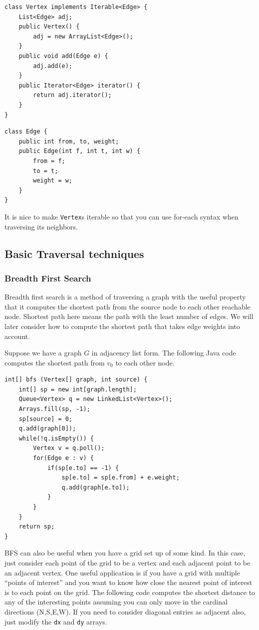 \documentclass[a4paper,12pt]{article}
\begin{document}
\begin{lstlisting}
class Vertex implements Iterable<Edge> {
	List<Edge> adj;
	public Vertex() {
		adj = new ArrayList<Edge>();
	}
	public void add(Edge e) {
		adj.add(e);
	}
	public Iterator<Edge> iterator() {
		return adj.iterator();
	}
}
\end{lstlisting}

\begin{lstlisting}
class Edge {
	public int from, to, weight;
	public Edge(int f, int t, int w) {
		from = f;
		to = t;
		weight = w;
	}
}
\end{lstlisting}

It is nice to make \verb|Vertex|s iterable so that you can use for-each syntax when traversing its neighbors. 

\subsection{Basic Traversal techniques}

\subsubsection{Breadth First Search}

Breadth first search is a method of traversing a graph with the useful property that it computes the shortest path from the source node to each other reachable node. Shortest path here means the path with the least number of edges. We will later consider how to compute the shortest path that takes edge weights into account.

Suppose we have a graph $G$ in adjacency list form. The following Java code computes the shortest path from $v_0$ to each other node. 

\begin{lstlisting}
int[] bfs (Vertex[] graph, int source) {
	int[] sp = new int[graph.length];
	Queue<Vertex> q = new LinkedList<Vertex>();
	Arrays.fill(sp, -1);
	sp[source] = 0;
	q.add(graph[0]);
	while(!q.isEmpty()) {
		Vertex v = q.poll();
		for(Edge e : v) {
			if(sp[e.to] == -1) {
				sp[e.to] = sp[e.from] + e.weight;
				q.add(graph[e.to]);
			}
		}
	}
	return sp;
}
\end{lstlisting}

BFS can also be useful when you have a grid set up of some kind. In this case, just consider each point of the grid to be a vertex and each adjacent point to be an adjacent vertex. One useful application is if you have a grid with multiple ``points of interest'' and you want to know how close the nearest point of interest is to each point on the grid. The following code computes the shortest distance to any of the interesting points assuming you can only move in the cardinal directions (N,S,E,W). If you need to consider diagonal entries as adjacent also, just modify the \verb|dx| and \verb|dy| arrays.
\end{document}
